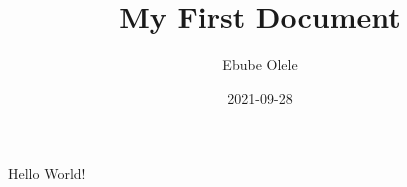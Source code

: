 \documentclass{article}
\title{My First Document}
\date{2021-09-28}
\author{Ebube Olele}
\begin{document}
	\maketitle
	\newpage
	Hello World!
\end{document}
